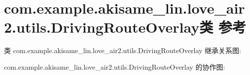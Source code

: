 \hypertarget{classcom_1_1example_1_1akisame__lin_1_1love__air2_1_1utils_1_1_driving_route_overlay}{}\section{com.\+example.\+akisame\+\_\+lin.\+love\+\_\+air2.\+utils.\+Driving\+Route\+Overlay类 参考}
\label{classcom_1_1example_1_1akisame__lin_1_1love__air2_1_1utils_1_1_driving_route_overlay}


类 com.\+example.\+akisame\+\_\+lin.\+love\+\_\+air2.\+utils.\+Driving\+Route\+Overlay 继承关系图\+:


com.\+example.\+akisame\+\_\+lin.\+love\+\_\+air2.\+utils.\+Driving\+Route\+Overlay 的协作图\+:
